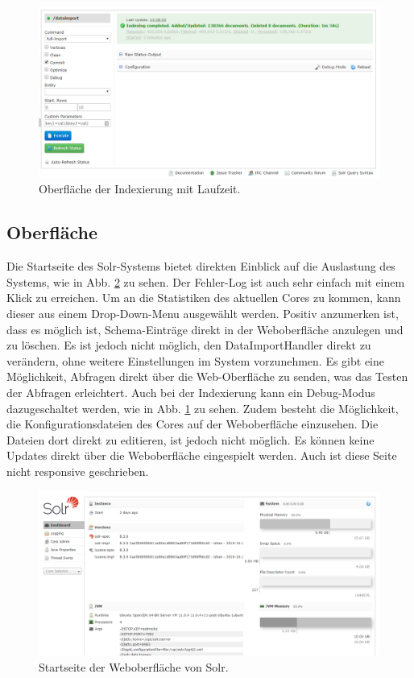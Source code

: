 \begin{figure}
	\centering
	\includegraphics[width=1\linewidth]{images/solr_indexing_time.png}
	\caption{Oberfläche der Indexierung mit Laufzeit.}
	\label{img:solrIndexTime}
\end{figure}

\subsection{Oberfläche}

Die Startseite des Solr-Systems bietet direkten Einblick auf die Auslastung des Systems, wie in Abb. \ref{img:solrInterface} zu sehen. Der Fehler-Log ist auch sehr einfach mit einem Klick zu erreichen. Um an die Statistiken des aktuellen Cores zu kommen, kann dieser aus einem Drop-Down-Menu ausgewählt werden. Positiv anzumerken ist, dass es möglich ist, Schema-Einträge direkt in der Weboberfläche anzulegen und zu löschen. Es ist jedoch nicht möglich, den DataImportHandler direkt zu verändern, ohne weitere Einstellungen im System vorzunehmen. Es gibt eine Möglichkeit, Abfragen direkt über die Web-Oberfläche zu senden, was das Testen der Abfragen erleichtert. Auch bei der Indexierung kann ein Debug-Modus dazugeschaltet werden, wie in Abb. \ref{img:solrIndexTime} zu sehen. Zudem besteht die Möglichkeit, die Konfigurationsdateien des Cores auf der Weboberfläche einzusehen. Die Dateien dort direkt zu editieren, ist jedoch nicht möglich.
Es können keine Updates direkt über die Weboberfläche eingespielt werden. Auch ist diese Seite nicht responsive geschrieben. 
\begin{figure}
	\centering
	\includegraphics[width=1\linewidth]{images/solr_interface.png}
	\caption{Startseite der Weboberfläche von Solr.}
	\label{img:solrInterface}
\end{figure}


